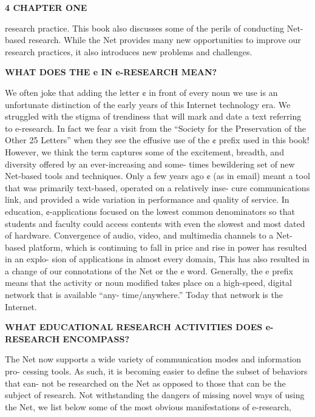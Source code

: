 \documentclass [10pt,a4paper]{book}
\begin{document}
\begin{flushleft}
\textbf{4    CHAPTER ONE}
\end{flushleft}
research practice. This book also discusses some of the perils of conducting Net-based
research. While the Net provides many new opportunities to improve our research
practices, it also introduces new problems and challenges.
\begin{flushleft}
\textbf{WHAT DOES THE e IN e-RESEARCH MEAN?}
\end{flushleft}
We often joke that adding the letter ¢ in front of every noun we use is an unfortunate
distinction of the early years of this Internet technology era. We struggled with the
stigma of trendiness that will mark and date a text referring to e-research. In fact we fear
a visit from the “Society for the Preservation of the Other 25 Letters” when they see
the effusive use of the ¢ prefix used in this book! However, we think the term captures
some of the excitement, breadth, and diversity offered by an ever-increasing and some-
times bewildering set of new Net-based tools and techniques. Only a few years ago ¢
(as in email) meant a tool that was primarily text-based, operated on a relatively inse-
cure communications link, and provided a wide variation in performance and quality
of service. In education, ¢-applications focused on the lowest common denominators
so that students and faculty could access contents with even the slowest and most dated
of hardware. Convergence of audio, video, and multimedia channels to a Net-based
platform, which is continuing to fall in price and rise in power has resulted in an explo-
sion of applications in almost every domain, This has also resulted in a change of our
connotations of the Net or the e word. Generally, the e prefix means that the activity
or noun modified takes place on a high-speed, digital network that is available “any-
time/anywhere.” Today that network is the Internet.
\begin{flushleft}
\textbf{WHAT EDUCATIONAL RESEARCH ACTIVITIES DOES
e-RESEARCH ENCOMPASS?}
\end{flushleft}
The Net now supports a wide variety of communication modes and information pro-
cessing tools. As such, it is becoming easier to define the subset of behaviors that ean-
not be researched on the Net as opposed to those that can be the subject of research.
Not withstanding the dangers of missing novel ways of using the Net, we list below
some of the most obvious manifestations of e-research,
\end{document}
